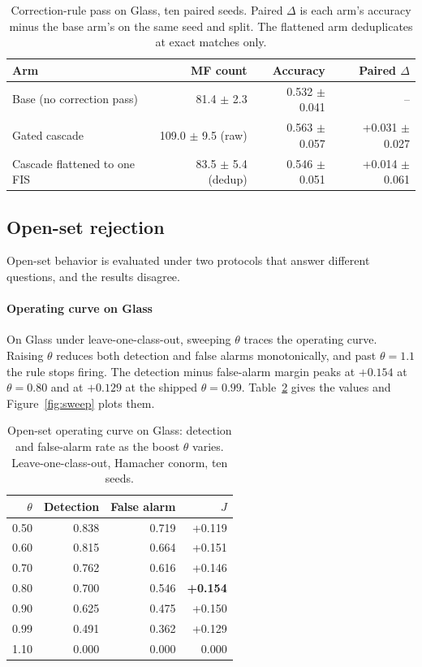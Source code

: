 \documentclass[journal]{IEEEtran}
\begin{document}
\begin{table}[t]
\centering
\caption{Correction-rule pass on Glass, ten paired seeds. Paired $\Delta$ is each arm's accuracy minus the base arm's on the same seed and split. The flattened arm deduplicates at exact matches only.}
\label{tab:correction}
\begin{tabular}{lrrr}
\toprule
Arm & MF count & Accuracy & Paired $\Delta$ \\
\midrule
Base (no correction pass) & 81.4 $\pm$ 2.3 & 0.532 $\pm$ 0.041 & -- \\
Gated cascade & 109.0 $\pm$ 9.5 (raw) & 0.563 $\pm$ 0.057 & +0.031 $\pm$ 0.027 \\
Cascade flattened to one FIS & 83.5 $\pm$ 5.4 (dedup) & 0.546 $\pm$ 0.051 & +0.014 $\pm$ 0.061 \\
\bottomrule
\end{tabular}
\end{table}

\subsection{Open-set rejection}
Open-set behavior is evaluated under two protocols that answer different questions, and the results disagree.

\paragraph{Operating curve on Glass}
On Glass under leave-one-class-out, sweeping $\theta$ traces the operating curve. Raising $\theta$ reduces both detection and false alarms monotonically, and past $\theta=1.1$ the rule stops firing. The detection minus false-alarm margin peaks at $+0.154$ at $\theta=0.80$ and at $+0.129$ at the shipped $\theta = 0.99$. Table~\ref{tab:theta} gives the values and Figure~\ref{fig:sweep} plots them.

\begin{table}[t]
\centering
\caption{Open-set operating curve on Glass: detection and false-alarm rate as the boost $\theta$ varies. Leave-one-class-out, Hamacher conorm, ten seeds.}
\label{tab:theta}
\begin{tabular}{rrrr}
\toprule
$\theta$ & Detection & False alarm & $J$ \\
\midrule
0.50 & 0.838 & 0.719 & +0.119 \\
0.60 & 0.815 & 0.664 & +0.151 \\
0.70 & 0.762 & 0.616 & +0.146 \\
0.80 & 0.700 & 0.546 & \textbf{+0.154} \\
0.90 & 0.625 & 0.475 & +0.150 \\
0.99 & 0.491 & 0.362 & +0.129 \\
1.10 & 0.000 & 0.000 & 0.000 \\
\bottomrule
\end{tabular}
\end{table}
\end{document}
